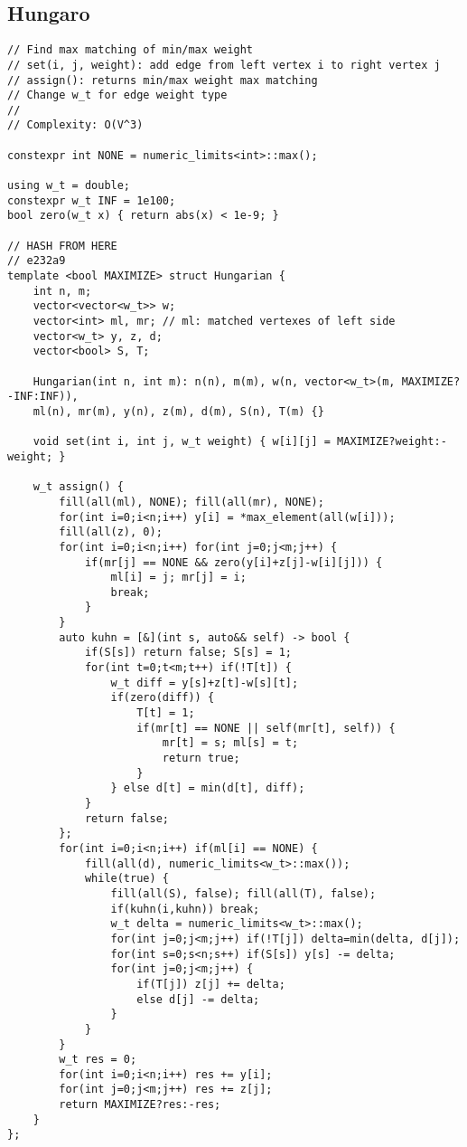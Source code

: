 \documentclass{article}
\begin{document}
\subsection{Hungaro}
\begin{verbatim}
// Find max matching of min/max weight
// set(i, j, weight): add edge from left vertex i to right vertex j 
// assign(): returns min/max weight max matching
// Change w_t for edge weight type
//
// Complexity: O(V^3)

constexpr int NONE = numeric_limits<int>::max();

using w_t = double;
constexpr w_t INF = 1e100;
bool zero(w_t x) { return abs(x) < 1e-9; }

// HASH FROM HERE
// e232a9
template <bool MAXIMIZE> struct Hungarian {
	int n, m;
	vector<vector<w_t>> w;
	vector<int> ml, mr; // ml: matched vertexes of left side
	vector<w_t> y, z, d;
	vector<bool> S, T;

	Hungarian(int n, int m): n(n), m(m), w(n, vector<w_t>(m, MAXIMIZE?-INF:INF)), 
	ml(n), mr(m), y(n), z(m), d(m), S(n), T(m) {}

	void set(int i, int j, w_t weight) { w[i][j] = MAXIMIZE?weight:-weight; }

	w_t assign() {
		fill(all(ml), NONE); fill(all(mr), NONE);
		for(int i=0;i<n;i++) y[i] = *max_element(all(w[i]));
		fill(all(z), 0);
		for(int i=0;i<n;i++) for(int j=0;j<m;j++) {
			if(mr[j] == NONE && zero(y[i]+z[j]-w[i][j])) {
				ml[i] = j; mr[j] = i;
				break;
			}
		}
		auto kuhn = [&](int s, auto&& self) -> bool {
			if(S[s]) return false; S[s] = 1;
			for(int t=0;t<m;t++) if(!T[t]) {
				w_t diff = y[s]+z[t]-w[s][t];
				if(zero(diff)) {
					T[t] = 1;
					if(mr[t] == NONE || self(mr[t], self)) {
						mr[t] = s; ml[s] = t;
						return true;
					}
				} else d[t] = min(d[t], diff);
			}
			return false;
		};
		for(int i=0;i<n;i++) if(ml[i] == NONE) {
			fill(all(d), numeric_limits<w_t>::max());
			while(true) {
				fill(all(S), false); fill(all(T), false);
				if(kuhn(i,kuhn)) break;
				w_t delta = numeric_limits<w_t>::max();
				for(int j=0;j<m;j++) if(!T[j]) delta=min(delta, d[j]);
				for(int s=0;s<n;s++) if(S[s]) y[s] -= delta;
				for(int j=0;j<m;j++) {
					if(T[j]) z[j] += delta;
					else d[j] -= delta;
				}
			}
		}
		w_t res = 0;
		for(int i=0;i<n;i++) res += y[i];
		for(int j=0;j<m;j++) res += z[j];
		return MAXIMIZE?res:-res;
	}
};
\end{verbatim}
\end{document}
